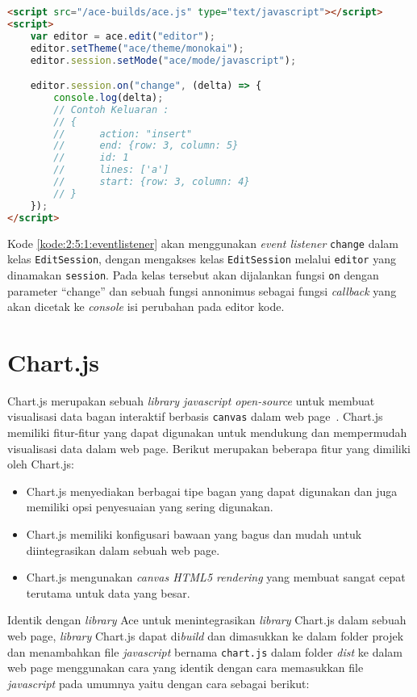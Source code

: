 \begin{lstlisting}[language={html}, caption={Contoh kode event listener}, label={kode:2:5:1:eventlistener}]
<script src="/ace-builds/ace.js" type="text/javascript"></script>
<script>
	var editor = ace.edit("editor");
	editor.setTheme("ace/theme/monokai");
	editor.session.setMode("ace/mode/javascript");

	editor.session.on("change", (delta) => {
        console.log(delta);
		// Contoh Keluaran :
		// {
		// 		action: "insert"
		// 		end: {row: 3, column: 5}
		// 		id: 1
		// 		lines: ['a']
		// 		start: {row: 3, column: 4}
		// }
	});
</script>
\end{lstlisting}

Kode \ref{kode:2:5:1:eventlistener} akan menggunakan \textit{event listener} \verb|change| dalam kelas \verb|EditSession|, dengan mengakses kelas \verb|EditSession| melalui \verb|editor| yang dinamakan \verb|session|. Pada kelas tersebut akan dijalankan fungsi \verb|on| dengan parameter ``change'' dan sebuah fungsi annonimus sebagai fungsi \textit{callback} yang akan dicetak ke \textit{console} isi perubahan pada editor kode.

\section{Chart.js}

Chart.js merupakan sebuah \textit{library javascript open-source} untuk membuat visualisasi data bagan interaktif berbasis \verb|canvas| dalam web page~\cite{chartjs}. Chart.js memiliki fitur-fitur yang dapat digunakan untuk mendukung dan mempermudah visualisasi data dalam web page. Berikut merupakan beberapa fitur yang dimiliki oleh Chart.js:

\begin{itemize}
	\item Chart.js menyediakan berbagai tipe bagan yang dapat digunakan dan juga memiliki opsi penyesuaian yang sering digunakan.
	\item Chart.js memiliki konfigusari bawaan yang bagus dan mudah untuk diintegrasikan dalam sebuah web page.
	\item Chart.js mengunakan \textit{canvas HTML5 rendering} yang membuat sangat cepat terutama untuk data yang besar.
\end{itemize}
 
Identik dengan \textit{library} Ace untuk menintegrasikan \textit{library} Chart.js dalam sebuah web page, \textit{library} Chart.js dapat di\textit{build} dan dimasukkan ke dalam folder projek dan menambahkan file \textit{javascript} bernama \verb|chart.js| dalam folder \textit{dist} ke dalam web page menggunakan cara yang identik dengan cara memasukkan file \textit{javascript} pada umumnya yaitu dengan cara sebagai berikut:

